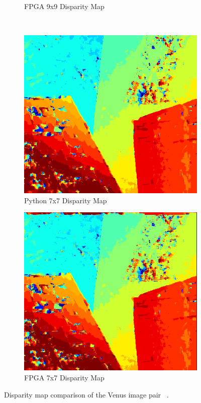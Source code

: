 \begin{figure}
\begin{center}
\begin{subfigure}{0.45\textwidth}
		\caption{FPGA 9x9 Disparity Map}
		\label{fig:venusFPGA}
	\end{subfigure}
	\\
	\begin{subfigure}{0.45\textwidth}
		\includegraphics[width=\textwidth]{figures/venus_7x7_python3.png}
		\caption{Python 7x7 Disparity Map}
		\label{fig:venusPy}
	\end{subfigure}
	\begin{subfigure}{0.45\textwidth}
		\includegraphics[width=\textwidth]{figures/venus_7x7_fpga.png}
		\caption{FPGA 7x7 Disparity Map}
		\label{fig:venusFPGA}
	\end{subfigure}
	\captionfonts
	\caption{Disparity map comparison of the Venus image pair ~\cite{middlebury}.}
	\label{fig:venusDispMap}
\end{center}
\end{figure}


